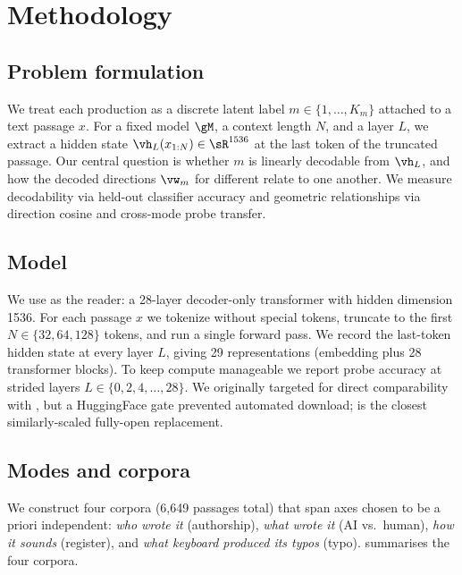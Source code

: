 \section{Methodology}
\label{sec:method}

\subsection{Problem formulation}

We treat each production \modes as a discrete latent label $m \in \{1, \ldots, K_m\}$ attached to a text passage $x$. For a fixed model $\gM$, a context length $N$, and a layer $L$, we extract a hidden state $\vh_{L}(x_{1:N}) \in \sR^{1536}$ at the last token of the truncated passage. Our central question is whether $m$ is linearly decodable from $\vh_{L}$, and how the decoded directions $\vw_m$ for different \modes relate to one another. We measure decodability via held-out classifier accuracy and geometric relationships via direction cosine and cross-mode probe transfer.

\subsection{Model}

We use \qwen as the reader: a 28-layer decoder-only transformer with hidden dimension 1536. For each passage $x$ we tokenize without special tokens, truncate to the first $N \in \{32, 64, 128\}$ tokens, and run a single forward pass. We record the last-token hidden state at every layer $L$, giving 29 representations (embedding plus 28 transformer blocks). To keep compute manageable we report probe accuracy at strided layers $L \in \{0, 2, 4, \ldots, 28\}$. We originally targeted \llama for direct comparability with \citet{sarfati2025prompt}, but a HuggingFace gate prevented automated download; \qwen is the closest similarly-scaled fully-open replacement.

\subsection{Modes and corpora}
\label{sec:corpora}

We construct four corpora (6,649 passages total) that span axes chosen to be a priori independent: \emph{who wrote it} (authorship), \emph{what wrote it} (AI vs.\ human), \emph{how it sounds} (register), and \emph{what keyboard produced its typos} (typo).  summarises the four corpora.


